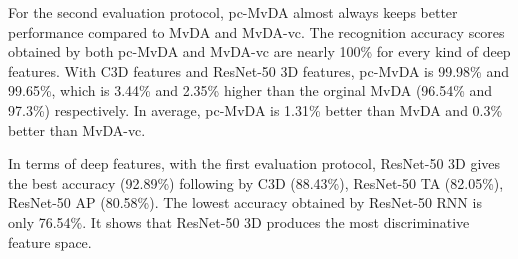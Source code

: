     For the second evaluation protocol, pc-MvDA almost always keeps better performance compared to MvDA and MvDA-vc. The recognition accuracy scores obtained by both pc-MvDA and MvDA-vc are nearly 100\% for every kind of deep features. With C3D features and ResNet-50 3D features, pc-MvDA is 99.98\% and 99.65\%, which is 3.44\% and 2.35\% higher than the orginal MvDA (96.54\% and 97.3\%) respectively. In average, pc-MvDA is 1.31\% better than MvDA and 0.3\% better than MvDA-vc. 

    In terms of deep features, with the first evaluation protocol, ResNet-50 3D gives the best accuracy (92.89\%) following by C3D (88.43\%), ResNet-50 TA (82.05\%), ResNet-50 AP (80.58\%). The lowest accuracy obtained by ResNet-50 RNN is only 76.54\%. It shows that ResNet-50 3D produces the most discriminative feature space. %

    \begin{table}[htbp]
    \centering
    \caption{Cross-view recognition results of different features on IXMAS dataset with pc-MvDA method. The result in the bracket are accuracies of using features C3D, ResNet-50 3D, ResNet-50 RNN, ResNet-50 TA, Restnet-50 AP respectively. Each row corresponds to training view (from view C0 to view C3). Each column corresponds to testing view (from view C0 to view C3).}
    \label{tab:cross_feature_ixmas}
    \end{table}

